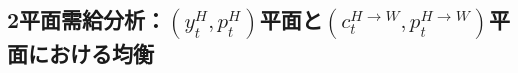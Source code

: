 
\subsection{2平面需給分析：\((y_t^H,p_t^H)\)平面と\((c_t^{H\to W},p_t^{H\to W})\)平面における均衡}
\label{sec:chapter5_two_plane}








